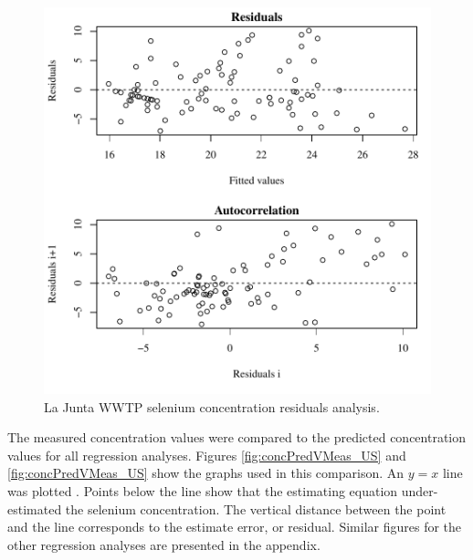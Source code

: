 \begin{figure}[htbp]
	\centering
	\includegraphics[width=\tableCustomSize]{"Figures/Results_USR/Stochastic/Conc Model lm-fit WTP"}
	\caption[La Junta WWTP selenium concentration residuals analysis.]{La Junta WWTP selenium concentration residuals analysis.}
	\label{fig:concLajwwtpNLS}
\end{figure}

The measured concentration values were compared to the predicted concentration values for all regression analyses.  Figures \ref{fig:concPredVMeas_US} and \ref{fig:concPredVMeas_US} show the graphs used in this comparison.  An $y=x$ line was plotted .  Points below the line show that the estimating equation under-estimated the selenium concentration.  The vertical distance between the point and the line corresponds to the estimate error, or residual.  Similar figures for the other regression analyses are presented in the appendix.

